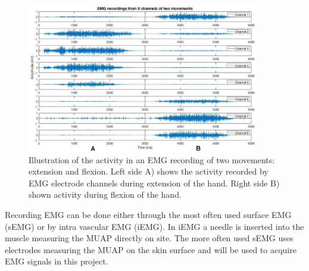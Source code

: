 \begin{figure}[H] 
	\includegraphics[width=0.9\textwidth]{figures/xBackground/EMGactivityExtensionFlexion}
	\caption{Illustration of the activity in an EMG recording of two movements: extension and flexion. Left side A) shows the activity recorded by EMG electrode channels during extension of the hand. Right side B) shown activity during flexion of the hand.}
	\label{fig:EMGactivityExtensionFlexion}
\end{figure}


Recording EMG can be done either through the most often used surface EMG (sEMG) or by intra vascular EMG (iEMG). In iEMG a needle is inserted into the muscle measuring the MUAP directly on site. The more often used sEMG uses electrodes measuring the MUAP on the skin surface and will be used to acquire EMG signals in this project. \cite{Cram2012} 
